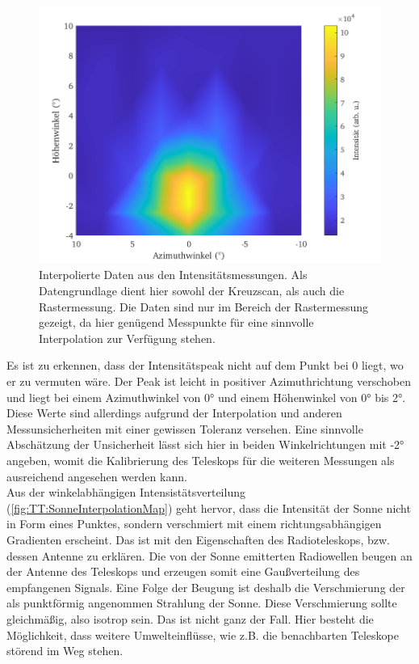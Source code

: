 \documentclass[../../main.tex]{subfiles}
\begin{document}
    \begin{figure}[H]
        \centering
        \includegraphics[width=\textwidth]{Bilddateien/Sun/Raster_Map_Fig_1011.png}
        \caption{Interpolierte Daten aus den Intensitätsmessungen. Als Datengrundlage dient hier sowohl der Kreuzscan, als auch die Rastermessung. Die Daten sind nur im Bereich der Rastermessung gezeigt, da hier genügend Messpunkte für eine sinnvolle Interpolation zur Verfügung stehen.}
        \label{fig:TT:SonneInterpolationMap}
    \end{figure}
    Es ist zu erkennen, dass der Intensitätspeak nicht auf dem Punkt bei 0 liegt, wo er zu vermuten wäre. Der Peak ist leicht in positiver Azimuthrichtung verschoben und liegt bei einem Azimuthwinkel von \ang{0} und einem Höhenwinkel von \ang{0} bis \ang{2}. Diese Werte sind allerdings aufgrund der Interpolation und anderen Messunsicherheiten mit einer gewissen Toleranz versehen. Eine sinnvolle Abschätzung der Unsicherheit lässt sich hier in beiden Winkelrichtungen mit \ang{+-2} angeben, womit die Kalibrierung des Teleskops für die weiteren Messungen als ausreichend angesehen werden kann. \\
    Aus der winkelabhängigen Intensistätsverteilung (\autoref{fig:TT:SonneInterpolationMap}) geht hervor, dass die Intensität der Sonne nicht in Form eines Punktes, sondern verschmiert mit einem richtungsabhängigen Gradienten erscheint. Das ist mit den Eigenschaften des Radioteleskops, bzw. dessen Antenne zu erklären. Die von der Sonne emitterten Radiowellen beugen an der Antenne des Teleskops und erzeugen somit eine Gaußverteilung des empfangenen Signals. Eine Folge der Beugung ist deshalb die Verschmierung der als punktförmig angenommen Strahlung der Sonne. Diese Verschmierung sollte gleichmäßig, also isotrop sein. Das ist nicht ganz der Fall. Hier besteht die Möglichkeit, dass weitere Umwelteinflüsse, wie z.B. die benachbarten Teleskope störend im Weg stehen. \\
\end{document}
